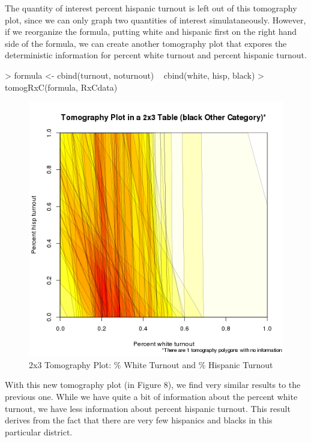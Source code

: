 \documentclass[11pt,oneside,letterpaper,titlepage]{article}
\begin{document}
\clearpage

\noindent The quantity of interest percent hispanic turnout is left
out of this tomography plot, since we can only graph two quantities of
interest simulataneously.  However, if we reorganize the formula,
putting white and hispanic first on the right hand side of the
formula, we can create another tomography plot that expores the
deterministic information for percent white turnout and percent
hispanic turnout.

\begin{Schunk}
\begin{Sinput}
> formula <- cbind(turnout, noturnout) ~ cbind(white, hisp, black)
> tomogRxC(formula, RxCdata)
\end{Sinput}
\end{Schunk}

\begin{figure}[Ht]
\begin{center}
\includegraphics{whitehispRxC.png} 
\end{center}
\caption{2x3 Tomography Plot: \% White Turnout and \% Hispanic Turnout}
\end{figure}


\noindent With this new tomography plot (in Figure 8), we find very similar results to the previous one.  While we have quite a bit of information about the percent white turnout, we have less information about percent hispanic turnout.  This result derives from the fact that there are very few hispanics and blacks in this particular district.
\end{document}
